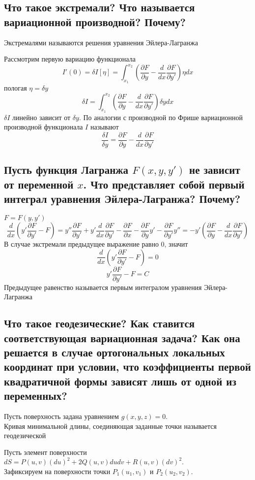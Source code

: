 \documentclass{article}
\newcommand{\EL}{Эйлера-Лагранжа}
\begin{document}
\subsection{Что такое экстремали? Что называется вариационной производной? Почему?}
Экстремалями называются решения уравнения \EL 

Рассмотрим первую вариацию функционала
\[ I'(0) = \delta I [\eta] = \int_{x_1}^{x_2}  \left( \frac{\partial F}{\partial y} - \frac{d}{dx}\frac{\partial F}{\partial y'}\right)\eta dx \]
пологая $ \eta = \delta y $
\[ \delta I = \int_{x_1}^{x_2}  \left( \frac{\partial F}{\partial y} - \frac{d}{dx}\frac{\partial F}{\partial y'}\right)\delta y dx \]
$ \delta I$ линейно зависит от $ \delta y $. По аналогии с производной по Фрише вариационной производной функционала $I$ называют
\[ \frac{\delta I}{\delta y} = \frac{\partial F}{\partial y} - \frac{d}{dx}\frac{\partial F}{\partial y'} \]

\subsection{Пусть функция Лагранжа $F(x, y, y')$ не зависит от переменной $x$. Что представляет собой первый интеграл уравнения Эйлера-Лагранжа? Почему?}
$F=F(y, y')$
\[ \frac{d}{dx}\left ( y'\frac{\partial F}{\partial y'} - F \right ) =  y''\frac{\partial F}{\partial y'}+y'\frac{d}{dx}\frac{\partial F}{\partial y'} - \frac{\partial F}{\partial x} - \frac{\partial F}{\partial y}y'-\frac{\partial F}{\partial y'}y'' = -y'\left(\frac{\partial F}{\partial y}- \frac{d}{dx} \frac{\partial F}{\partial y'} \right) \]
В случае экстремали предыдущее выражение равно 0, значит
\[ \frac{d}{dx}\left ( y'\frac{\partial F}{\partial y'} - F \right ) =0 \]
\[  y'\frac{\partial F}{\partial y'} - F  = C  \]
Предыдущее равенство называется первым интегралом уравнения \EL

\subsection{Что такое геодезические? Как ставится соответствующая вариационная задача? Как она решается в случае ортогональных локальных координат при условии, что коэффициенты первой квадратичной формы зависят лишь от одной из переменных?}
Пусть поверхность задана уравнением $ g(x,y,z)=0 $.\\
Кривая минимальной длины, соединяющая заданные точки называется геодезической

Пусть элемент поверхности $ dS = P(u,v)(du)^2 + 2Q(u,v)dudv+R(u,v) (dv)^2 $. \\
Зафиксируем на поверхности точки $ P_1(u_1, v_1) $ и $ P_2(u_2, v_2) $. 
\end{document}
